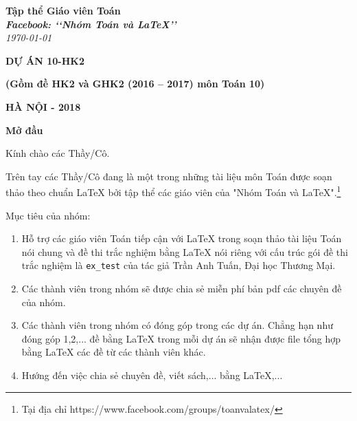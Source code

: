 \documentclass[12pt,a4paper,oneside]{article}
\begin{document}
	\begin{titlepage}
		\begin{flushright}
			\fontsize{17}{0}\selectfont
			\textbf{Tập thể Giáo viên Toán}\\
			\textbf{\textit{Facebook: \lq\lq Nhóm Toán và LaTeX\rq\rq}}\\
			\textit{\color{red}\today}
		\end{flushright}
		
		\vspace{4cm}
		
		\begin{flushright}
		\textbf{\fontsize{50}{0}\selectfont DỰ ÁN 10-HK2}
		
		\vspace{1cm}
		
      	\textbf{\fontsize{20}{0}\selectfont (Gồm đề HK2 và GHK2 (2016 -- 2017) môn Toán 10)}		
		\end{flushright}
		
		\vfill{
			\begin{flushright}
				\fontsize{17}{0}\textbf{HÀ NỘI - 2018}
			\end{flushright}
		}
	\end{titlepage}
	
	
	\pagestyle{fancy}
	\rfoot{\thepage}
	\cfoot{\empty}	
	\lfoot{\currfilename}
	\lhead{\currfilename}

\vspace*{1cm}
	
{\bf\LARGE Mở đầu}

\vspace*{1cm}
	
	Kính chào các Thầy/Cô.
	
	\vspace{0.6cm}
	
	\noindent Trên tay các Thầy/Cô đang là một trong những tài liệu môn Toán được soạn thảo theo chuẩn \LaTeX{} bởi tập thể các giáo viên của "Nhóm Toán và LaTeX".\footnote{Tại địa chỉ https://www.facebook.com/groups/toanvalatex/}
	
	\vspace{0.6cm}
	
	\noindent Mục tiêu của nhóm: 
	\begin{enumerate}[\bf 1.]
		\item Hỗ trợ các giáo viên Toán tiếp cận với \LaTeX{} trong soạn thảo tài liệu Toán nói chung và đề thi trắc nghiệm bằng \LaTeX{} nói riêng với cấu trúc gói đề thi trắc nghiệm là \texttt{ex\_test} của tác giả Trần Anh Tuấn, Đại học Thương Mại.
		\item Các thành viên trong nhóm sẽ được chia sẻ miễn phí bản pdf  các chuyên đề của nhóm.
		\item Các thành viên trong nhóm có đóng góp trong các dự án. Chẳng hạn như đóng góp 1,2,... đề bằng \LaTeX{} trong mỗi dự án sẽ nhận được file tổng hợp bằng \LaTeX{} các đề từ các thành viên khác.
		\item Hướng đến việc chia sẻ chuyên đề, viết sách,... bằng \LaTeX,...
    \end{enumerate}	
\end{document}
